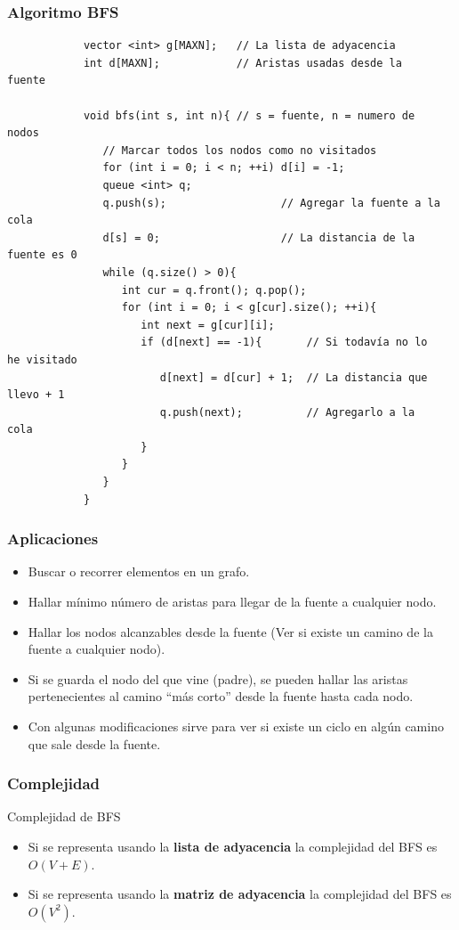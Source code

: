 \documentclass{beamer}
\begin{document}
	\begin{frame}[fragile]
		\frametitle{Algoritmo BFS}
		\begin{lstlisting}
			vector <int> g[MAXN];   // La lista de adyacencia
			int d[MAXN];            // Aristas usadas desde la
fuente

			void bfs(int s, int n){ // s = fuente, n = numero de
nodos
			   // Marcar todos los nodos como no visitados
			   for (int i = 0; i < n; ++i) d[i] = -1;
			   queue <int> q;                
			   q.push(s);                  // Agregar la fuente a la
cola
			   d[s] = 0;                   // La distancia de la
fuente es 0
			   while (q.size() > 0){
			      int cur = q.front(); q.pop();
			      for (int i = 0; i < g[cur].size(); ++i){
			         int next = g[cur][i];
			         if (d[next] == -1){       // Si todavía no lo
he visitado
			            d[next] = d[cur] + 1;  // La distancia que
llevo + 1
			            q.push(next);          // Agregarlo a la
cola
			         }
			      }
			   }
			}
		\end{lstlisting}
	\end{frame}

	\begin{frame}
		\frametitle{Aplicaciones}
		\begin{itemize}
			\item Buscar o recorrer elementos en un grafo.
			\item Hallar mínimo número de aristas para llegar de la
fuente a cualquier nodo.
			\item Hallar los nodos alcanzables desde la fuente (Ver
si existe un camino de la fuente a cualquier nodo).
			\item Si se guarda el nodo del que vine (padre), se
pueden hallar las aristas pertenecientes al camino ``más corto'' desde la fuente
hasta cada nodo.
			\item Con algunas modificaciones sirve para ver si
existe un ciclo en algún camino que sale desde la fuente.
		\end{itemize}
	\end{frame}

	\begin{frame}
		\frametitle{Complejidad}
		\begin{block}{Complejidad de BFS}
			\begin{itemize}
				\item Si se representa usando la \textbf{lista
de adyacencia} la complejidad del BFS es $O(V+E)$.
				\item Si se representa usando la \textbf{matriz
de adyacencia} la complejidad del BFS es $O(V^2)$.
			\end{itemize}
		\end{block}
	\end{frame}
\end{document}
